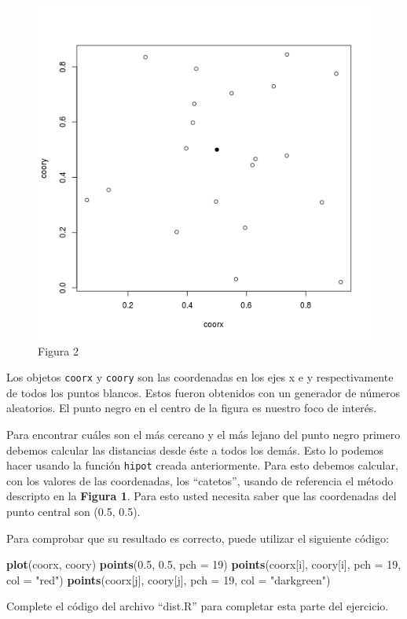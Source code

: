 \documentclass[]{article}
\makeatletter
\newenvironment{Shaded}{}{}
\newcommand{\KeywordTok}[1]{\textcolor[rgb]{0.00,0.44,0.13}{\textbf{{#1}}}}
\newcommand{\DataTypeTok}[1]{\textcolor[rgb]{0.56,0.13,0.00}{{#1}}}
\newcommand{\DecValTok}[1]{\textcolor[rgb]{0.25,0.63,0.44}{{#1}}}
\newcommand{\FloatTok}[1]{\textcolor[rgb]{0.25,0.63,0.44}{{#1}}}
\newcommand{\StringTok}[1]{\textcolor[rgb]{0.25,0.44,0.63}{{#1}}}
\newcommand{\NormalTok}[1]{{#1}}
\def\maxwidth{\ifdim\Gin@nat@width>\linewidth\linewidth
\else\Gin@nat@width\fi}
\let\Oldincludegraphics\includegraphics
\renewcommand{\includegraphics}[1]{\Oldincludegraphics[width=\maxwidth]{#1}}
\makeatother
\begin{document}
\begin{figure}[htbp]
\centering
\includegraphics{figure/unnamed-chunk-11.png}
\caption{Figura 2}
\end{figure}

Los objetos \texttt{coorx} y \texttt{coory} son las coordenadas en los
ejes x e y respectivamente de todos los puntos blancos. Estos fueron
obtenidos con un generador de números aleatorios. El punto negro en el
centro de la figura es nuestro foco de interés.

Para encontrar cuáles son el más cercano y el más lejano del punto negro
primero debemos calcular las distancias desde éste a todos los demás.
Esto lo podemos hacer usando la función \texttt{hipot} creada
anteriormente. Para esto debemos calcular, con los valores de las
coordenadas, los ``catetos'', usando de referencia el método descripto
en la \textbf{Figura 1}. Para esto usted necesita saber que las
coordenadas del punto central son (0.5, 0.5).

Para comprobar que su resultado es correcto, puede utilizar el siguiente
código:

\begin{Shaded}
\begin{Highlighting}[]
\KeywordTok{plot}\NormalTok{(coorx, coory)}
\KeywordTok{points}\NormalTok{(}\FloatTok{0.5}\NormalTok{, }\FloatTok{0.5}\NormalTok{, }\DataTypeTok{pch =} \DecValTok{19}\NormalTok{)}
\KeywordTok{points}\NormalTok{(coorx[i], coory[i], }\DataTypeTok{pch =} \DecValTok{19}\NormalTok{, }\DataTypeTok{col =} \StringTok{"red"}\NormalTok{)}
\KeywordTok{points}\NormalTok{(coorx[j], coory[j], }\DataTypeTok{pch =} \DecValTok{19}\NormalTok{, }\DataTypeTok{col =} \StringTok{"darkgreen"}\NormalTok{)}
\end{Highlighting}
\end{Shaded}
Complete el código del archivo ``dist.R'' para completar esta parte del
ejercicio.
\end{document}
